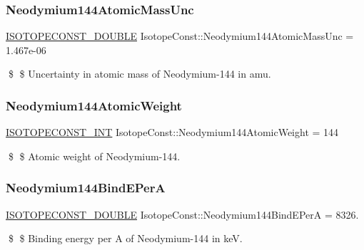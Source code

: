 \subsubsection{\texorpdfstring{Neodymium144\+Atomic\+Mass\+Unc}{Neodymium144AtomicMassUnc}}
{\footnotesize\ttfamily \mbox{\hyperlink{group___isotope_const-_macros_ga8f45a7272ce02c0b4c65c44636ed719a}{I\+S\+O\+T\+O\+P\+E\+C\+O\+N\+S\+T\+\_\+\+D\+O\+U\+B\+LE}} Isotope\+Const\+::\+Neodymium144\+Atomic\+Mass\+Unc = 1.\+467e-\/06}

\$ \$ Uncertainty in atomic mass of Neodymium-\/144 in amu. \mbox{\label{group___isotope_const-_neodymium-_nd144_ga80ee2978774d79c26e94ec46b06647fa}} 
\subsubsection{\texorpdfstring{Neodymium144\+Atomic\+Weight}{Neodymium144AtomicWeight}}
{\footnotesize\ttfamily \mbox{\hyperlink{group___isotope_const-_macros_ga5f18360b3e99483a35c32d789e62621c}{I\+S\+O\+T\+O\+P\+E\+C\+O\+N\+S\+T\+\_\+\+I\+NT}} Isotope\+Const\+::\+Neodymium144\+Atomic\+Weight = 144}

\$ \$ Atomic weight of Neodymium-\/144. \mbox{\label{group___isotope_const-_neodymium-_nd144_ga896dcdbd3382deed609f4ae29f6334e2}} 
\subsubsection{\texorpdfstring{Neodymium144\+Bind\+E\+PerA}{Neodymium144BindEPerA}}
{\footnotesize\ttfamily \mbox{\hyperlink{group___isotope_const-_macros_ga8f45a7272ce02c0b4c65c44636ed719a}{I\+S\+O\+T\+O\+P\+E\+C\+O\+N\+S\+T\+\_\+\+D\+O\+U\+B\+LE}} Isotope\+Const\+::\+Neodymium144\+Bind\+E\+PerA = 8326.}

\$ \$ Binding energy per A of Neodymium-\/144 in keV. \mbox{\label{group___isotope_const-_neodymium-_nd144_ga3d5a92a30f424cbc10b4647c0eaf20bc}} 
